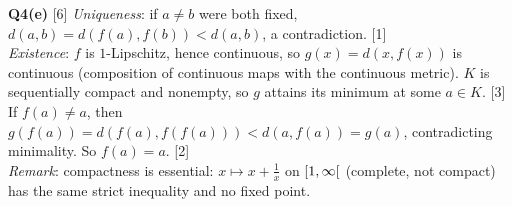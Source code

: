 \textbf{Q4(e)} [6] \emph{Uniqueness}: if $a\ne b$ were both fixed,
$d(a,b)=d(f(a),f(b))<d(a,b)$, a contradiction. [1]\\
\emph{Existence}: $f$ is $1$-Lipschitz, hence continuous, so $g(x)=d(x,f(x))$ is continuous
(composition of continuous maps with the continuous metric). $K$ is sequentially compact and
nonempty, so $g$ attains its minimum at some $a\in K$. [3] If $f(a)\ne a$, then
$g(f(a))=d(f(a),f(f(a)))<d(a,f(a))=g(a)$, contradicting minimality. So $f(a)=a$. [2]\\
\emph{Remark}: compactness is essential: $x\mapsto x+\frac1x$ on $\mathopen{[}1,\infty\mathclose{[}$ (complete, not
compact) has the same strict inequality and no fixed point.
